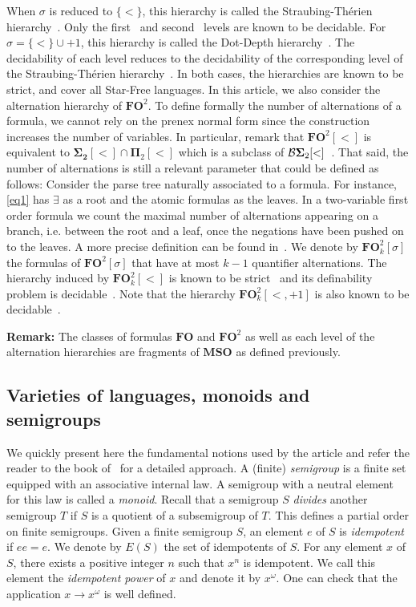 \documentclass[submission,hidelink]{dmtcs-episciences}
\newcommand{\FO}{\mathbf{FO}}
\newcommand{\MSO}{\mathbf{MSO}}
\newcommand{\BS}{\mathbf{{\cal B}\Sigma}}
\begin{document}
	When $\sigma$ is reduced to $\{<\}$, this hierarchy is called the Straubing-Th\'erien hierarchy~\citep{Straubing81,Th81}.
	Only the first~\citep{SI75} and second~\citep{PZ14} levels are known to be decidable.
	For ${\sigma=\{<\}\cup +1}$, this hierarchy is called the Dot-Depth hierarchy~\citep{BC71}.
	The decidability of each level reduces to the decidability of the corresponding
	level of the Straubing-Th\'erien hierarchy~\citep{Straubing85}.
	In both cases, the hierarchies are known to be strict, and cover all Star-Free languages.
	In this article, we also consider the alternation hierarchy of $\FO^2$.
	To define formally the number of alternations of a formula,
	we cannot rely on the prenex normal form since the construction increases the number of variables.
	In particular, remark that $\FO^2[<]$ is equivalent to $\mathbf{\Sigma_2}[<]\cap \mathbf{\Pi}_2[<]$ which
	is a subclass of $\BS_2[<]$~\citep{DGK08}.
	 That said, the number
	of alternations is still a relevant parameter that could be defined as follows:
	Consider the parse tree naturally associated to a formula. For instance,
	\eqref{eq1} has $\exists$ as a root  and the atomic formulas as the leaves.
	In a two-variable first order formula we count the maximal number of alternations appearing on a branch, i.e. between the
	root and a leaf,
	once the negations have been pushed on to the leaves. A more precise definition
	can be found in~\cite{IW09}. We denote by $\FO^2_k[\sigma]$
	the formulas of $\FO^2[\sigma]$ that have at most $k-1$ quantifier alternations.
	The hierarchy induced by $\FO^2_k[<]$ is known to be strict~\citep{IW09} and its definability
	problem is decidable~\citep{KS12,KW12}.
	Note that the hierarchy $\FO^2_k[<,+1]$ is also known to be decidable~\citep{KL13}.

	\textbf{Remark:} The classes of formulas $\FO$ and $\FO^2$
	as well as each level of the alternation hierarchies are fragments of $\MSO$ as defined previously.

	\subsection{Varieties of languages, monoids and semigroups}
We quickly present here the fundamental notions used by the article and refer the reader to the book of~\cite{Pin97a} for a detailed approach.
A (finite) \emph{semigroup} is a finite set equipped with an associative internal law.
A semigroup with a neutral element for this law is called a \emph{monoid}.
Recall that a semigroup $S$ \emph{divides} another semigroup $T$ if $S$ is a quotient of a
subsemigroup of $T$.
This defines a partial order on finite semigroups.
Given a finite semigroup $S$, an element $e$ of $S$ is \emph{idempotent} if $ee=e$.
We denote by $E(S)$ the set of idempotents of $S$.
For any element $x$ of $S$, there exists a positive integer $n$ such that $x^n$ is idempotent. We call this element the \emph{idempotent power} of $x$ and denote it by $x^\omega$.
One can check that the application $x\to x^\omega$ is well defined.
\end{document}
